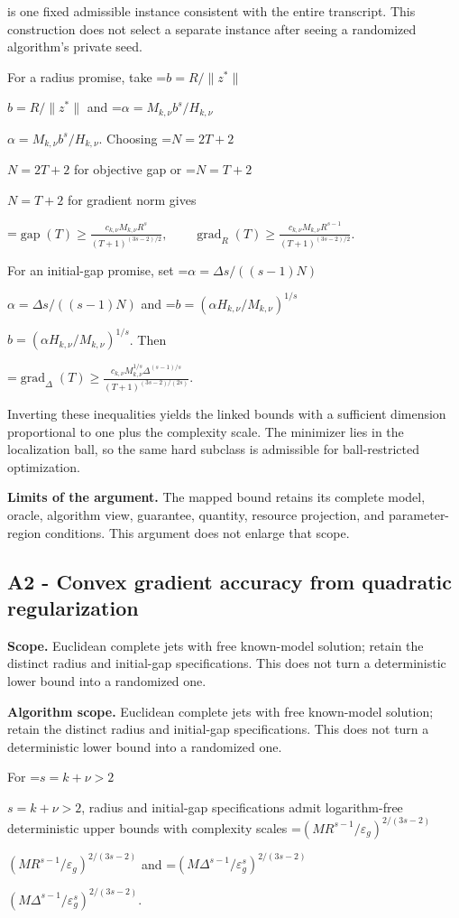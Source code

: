 \documentclass[10pt,a4paper]{article}
\newcommand{\AtlasMath}[1]{\par\begingroup\centering\setbox0=\hbox{$\displaystyle #1$}\ifdim\wd0>1.4\linewidth\typeout{ATLAS WIDE FORMULA: \the\wd0}\fi\ifdim\wd0>\linewidth\resizebox{\linewidth}{!}{\box0}\else\box0\fi\par\endgroup}
\newcommand{\AtlasInlineMath}[1]{\begingroup\setbox0=\hbox{$#1$}\ifdim\wd0>.4\linewidth\endgroup\AtlasMath{#1}\else\endgroup$#1$\fi}
\begin{document}
is one fixed admissible instance consistent with the entire transcript. This construction does not select a separate instance after seeing a randomized algorithm's private seed.

For a radius promise, take \AtlasInlineMath{b=R/\|z^*\|} and \AtlasInlineMath{\alpha=M_{k,\nu}b^s/H_{k,\nu}}. Choosing \AtlasInlineMath{N=2T+2} for objective gap or \AtlasInlineMath{N=T+2} for gradient norm gives

\AtlasMath{\operatorname{gap}(T)\ge\frac{c_{k,\nu}M_{k,\nu}R^s}{(T+1)^{(3s-2)/2}},\qquad
\operatorname{grad}_R(T)\ge\frac{c_{k,\nu}M_{k,\nu}R^{s-1}}{(T+1)^{(3s-2)/2}}.}

For an initial-gap promise, set \AtlasInlineMath{\alpha=\Delta s/((s-1)N)} and \AtlasInlineMath{b=(\alpha H_{k,\nu}/M_{k,\nu})^{1/s}}. Then

\AtlasMath{\operatorname{grad}_\Delta(T)\ge\frac{c_{k,\nu}M_{k,\nu}^{1/s}\Delta^{(s-1)/s}}{(T+1)^{(3s-2)/(2s)}}.}

Inverting these inequalities yields the linked bounds with a sufficient dimension proportional to one plus the complexity scale. The minimizer lies in the localization ball, so the same hard subclass is admissible for ball-restricted optimization.

\textbf{Limits of the argument.} The mapped bound retains its complete model, oracle, algorithm view, guarantee, quantity, resource projection, and parameter-region conditions. This argument does not enlarge that scope.

\subsection{A2 - Convex gradient accuracy from quadratic regularization}
\textbf{Scope.} Euclidean complete jets with free known-model solution; retain the distinct radius and initial-gap specifications. This does not turn a deterministic lower bound into a randomized one.

\textbf{Algorithm scope.} Euclidean complete jets with free known-model solution; retain the distinct radius and initial-gap specifications. This does not turn a deterministic lower bound into a randomized one.

For \AtlasInlineMath{s=k+\nu>2}, radius and initial-gap specifications admit logarithm-free deterministic upper bounds with complexity scales \AtlasInlineMath{(MR^{s-1}/\varepsilon_g)^{2/(3s-2)}} and \AtlasInlineMath{(M\Delta^{s-1}/\varepsilon_g^s)^{2/(3s-2)}}.
\end{document}
